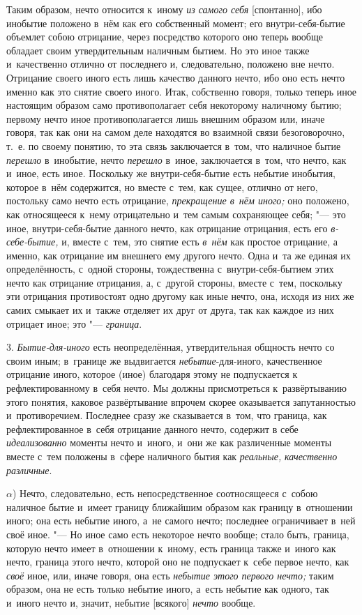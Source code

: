 Таким образом, нечто относится к~иному {\em из самого
себя} [спонтанно], ибо инобытие положено в~нём как его собственный
момент; его внутри-себя-бытие объемлет собою отрицание, через посредство
которого оно теперь вообще обладает своим утвердительным наличным бытием.
Но это иное также и~качественно отлично от последнего и, следовательно,
положено вне нечто. Отрицание своего иного есть лишь качество данного
нечто, ибо оно есть нечто именно как это снятие своего иного. Итак,
собственно говоря, только теперь иное настоящим образом само
противополагает себя некоторому наличному бытию; первому нечто иное
противополагается лишь внешним образом или, иначе говоря, так как они на
самом деле находятся во взаимной связи безоговорочно, т.~е. по своему
понятию, то эта связь заключается в~том, что наличное бытие
{\em перешло} в~инобытие, нечто
{\em перешло} в~иное, заключается в~том, что нечто,
как и~иное, есть иное. Поскольку же внутри-себя-бытие есть небытие
инобытия, которое в~нём содержится, но вместе с~тем, как сущее, отлично от
него, постольку само нечто есть отрицание,
{\em прекращение в~нём иного;} оно
положено, как относящееся к~нему отрицательно и~тем самым сохраняющее себя;
"--- это иное, внутри-себя-бытие данного нечто, как отрицание отрицания,
есть его {\em в-себе-бытие,} и, вместе с~тем, это
снятие есть {\em в~нём} как простое отрицание, а
именно, как отрицание им внешнего ему другого нечто. Одна и~та же единая их
определённость, с~одной стороны, тождественна с~внутри-себя-бытием этих
нечто как отрицание отрицания, а, с~другой стороны, вместе с~тем, поскольку
эти отрицания противостоят одно другому как иные нечто, она,
исходя из них же самих смыкает их и~также отделяет их друг от друга,
так как каждое из них отрицает иное; это "--- {\em граница}.

3. {\em Бытие-для-иного} есть неопределённая,
утвердительная общность нечто со своим иным; в~границе же выдвигается
{\em небытие}-для-иного, качественное отрицание
иного, которое (иное) благодаря этому не подпускается к
рефлектированному в~себя нечто. Мы должны присмотреться к~развёртыванию
этого понятия, каковое развёртывание впрочем скорее оказывается
запутанностью и~противоречием. Последнее сразу же сказывается в~том, что
граница, как рефлектированное в~себя отрицание данного нечто, содержит в
себе {\em идеализованно} моменты нечто и~иного, и~они
же как различенные моменты вместе с~тем положены в~сфере наличного бытия
как {\em реальные,}
{\em качественно различные}.

$\alpha$) Нечто, следовательно, есть непосредственное соотносящееся
с~собою наличное бытие и~имеет границу ближайшим образом как границу
в~отношении иного; она есть небытие иного, а~не самого нечто; последнее
ограничивает в~ней своё иное. "--- Но иное само есть некоторое нечто вообще;
стало быть, граница, которую нечто имеет в~отношении к~иному, есть граница
также и~иного как нечто, граница этого нечто, которой оно не подпускает к~себе
первое нечто, как {\em своё} иное, или, иначе говоря, она есть
{\em небытие этого первого нечто;} таким образом, она не есть только небытие
иного, а~есть небытие как одного, так и~иного нечто и, значит, небытие
[всякого] {\em нечто} вообще.

